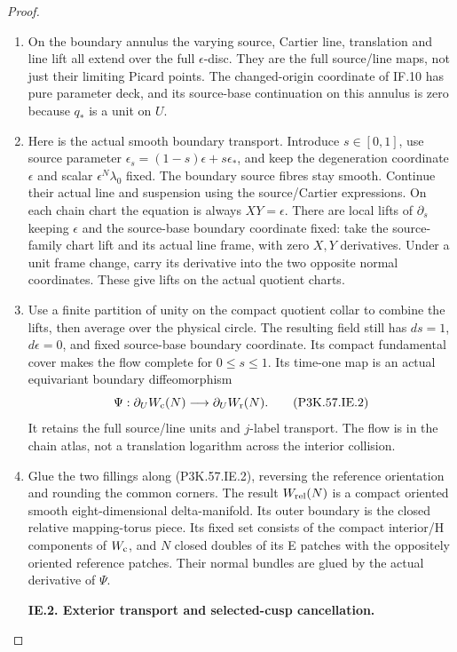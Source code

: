 \begin{proof}
\begin{enumerate}[label=\arabic*.]
\item On the boundary annulus the varying source, Cartier line,
translation and line lift all extend over the full
\(\epsilon\)-disc. They are the full source/line maps, not just
their limiting Picard points. The changed-origin coordinate
of IF.10 has pure parameter deck, and its source-base
continuation on this annulus is zero because \(q_*\) is a unit
on \(U\).

\item Here is the actual smooth boundary transport. Introduce
\(s\in[0,1]\), use source parameter
\(\epsilon_s=(1-s)\epsilon+s\epsilon_*\), and keep the
degeneration coordinate \(\epsilon\) and scalar
\(\epsilon^N\lambda_0\) fixed. The boundary source fibres
stay smooth. Continue their actual line and suspension
using the source/Cartier expressions. On each chain chart
the equation is always \(XY=\epsilon\). There are local
lifts of \(\partial_s\) keeping \(\epsilon\) and the
source-base boundary coordinate fixed: take the
source-family chart lift and its actual line frame,
with zero \(X,Y\) derivatives. Under a unit frame change,
carry its derivative into the two opposite normal
coordinates. These give lifts on the actual quotient
charts.

\item Use a finite partition of unity on the compact quotient
collar to combine the lifts, then average over the physical
circle. The resulting field still has \(ds=1\),
\(d\epsilon=0\), and fixed source-base boundary coordinate.
Its compact fundamental cover makes the flow complete for
\(0\le s\le1\). Its time-one map is an actual equivariant
boundary diffeomorphism
\[
        \Psi:\partial_U W_{\rm c}(N)
                   \longrightarrow\partial_U W_{\rm r}(N).   \tag{P3K.57.IE.2}
\]
It retains the full source/line units and \(j\)-label
transport. The flow is in the chain atlas, not a
translation logarithm across the interior collision.

\item Glue the two fillings along (P3K.57.IE.2), reversing the reference
orientation and rounding the common corners. The result
\(W_{\rm rel}(N)\) is a compact oriented smooth
eight-dimensional delta-manifold. Its outer boundary is
the closed relative mapping-torus piece. Its fixed set
consists of the compact interior/H components of
\(W_{\rm c}\), and \(N\) closed doubles of its E patches
with the oppositely oriented reference patches. Their
normal bundles are glued by the actual derivative of
\(\Psi\).

\par\medskip\noindent\textbf{IE.2. Exterior transport and selected-cusp cancellation.}\par\nopagebreak[4]


\end{enumerate}
\end{proof}
